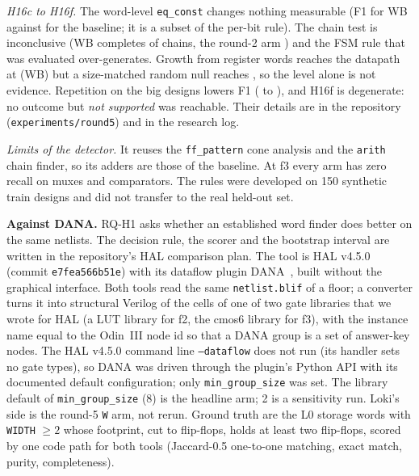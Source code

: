 \documentclass[conference]{IEEEtran}
\newcommand{\hev}[1]{\par\smallskip\noindent\textbf{#1}}
\newcommand{\code}[1]{\texttt{#1}}
\begin{document}
\emph{H16c to H16f.} The word-level \code{eq\_const} changes nothing measurable (F1 \rfvHcfonewb{} for WB against
\rfvHcfonebase{} for the baseline; it is a subset of the per-bit rule). The chain test is inconclusive (WB completes
\rfvHdcompletewb{} of \rfvHdpairedchains{} chains, the round-2 arm \rfvHdcompletertwon{}) and the FSM rule that was
evaluated over-generates. Growth from register words reaches the datapath at \rfvHedatapathwb{} (WB) but a size-matched
random null reaches \rfvHednull{}, so the level alone is not evidence. Repetition on the big designs lowers F1 (\rfvHffoneall{}
to \rfvHffonef{}), and H16f is degenerate: no outcome but \emph{not supported} was reachable. Their details are in the
repository (\code{experiments/round5}) and in the research log.

\emph{Limits of the detector.} It reuses the \code{ff\_pattern} cone analysis and the \code{arith} chain finder, so its
adders are those of the baseline. At f3 every arm has zero recall on muxes and comparators. The rules were developed on
150 synthetic train designs and did not transfer to the real held-out set.

\hev{Against DANA.}\label{sec:hal} 
RQ-H1 asks whether an established word finder does better on the same netlists. The decision rule, the scorer and the bootstrap interval are written in the repository's HAL comparison plan. The tool is
HAL v4.5.0 (commit \code{e7fea566b51e}) with its dataflow plugin DANA~\cite{hal,albartus2020dana},
built without the graphical interface. Both tools read the same \code{netlist.blif} of a floor;
a converter turns it into structural Verilog of the cells of one of two gate libraries that we
wrote for HAL (a LUT library for f2, the cmos6 library for f3), with the instance name equal to the
Odin~III node id so that a DANA group is a set of answer-key nodes. The HAL v4.5.0 command line
\code{--dataflow} does not run (its handler sets no gate types), so DANA was driven through the
plugin's Python API with its documented default configuration; only \code{min\_group\_size} was
set. The library default of \code{min\_group\_size} (8) is the headline arm; 2 is a sensitivity run.
Loki's side is the round-5 \code{W} arm, not rerun. Ground truth are the L0 storage words with
\code{WIDTH} $\ge 2$ whose footprint, cut to flip-flops, holds at least two flip-flops, scored by one code path for both tools (Jaccard-0.5 one-to-one matching, exact
match, purity, completeness).
\end{document}
